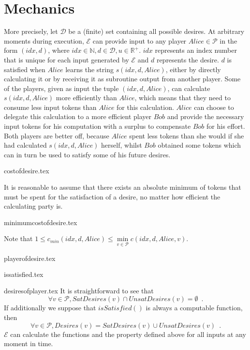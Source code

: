 \section{Mechanics}
  More precisely, let $\mathcal{D}$ be a (finite) set containing all possible desires. At
  arbitrary moments during execution, $\mathcal{E}$ can provide input to any player $Alice
  \in \mathcal{P}$ in the form $\left(idx, d\right)$, where $idx \in \mathbb{N}, d \in
  \mathcal{D}, u \in \mathbb{R}^{+}$. $idx$ represents an index number that is unique for
  each input generated by $\mathcal{E}$ and $d$ represents the desire. $d$ is satisfied
  when $Alice$ learns the string $s\left(idx, d, Alice\right)$, either by directly
  calculating it or by receiving it as subroutine output from another player. Some of the
  players, given as input the tuple $\left(idx, d, Alice\right)$, can calculate
  $s\left(idx, d, Alice\right)$ more efficiently than $Alice$, which means that they need
  to consume less input tokens than $Alice$ for this calculation. $Alice$ can choose to
  delegate this calculation to a more efficient player $Bob$ and provide the necessary
  input tokens for his computation with a surplus to compensate $Bob$ for his effort. Both
  players are better off, because $Alice$ spent less tokens than she would if she had
  calculated $s\left(idx, d, Alice\right)$ herself, whilst $Bob$ obtained some tokens
  which can in turn be used to satisfy some of his future desires.

  {costofdesire.tex}

  It is reasonable to assume that there exists an absolute minimum of tokens that must be
  spent for the satisfaction of a desire, no matter how efficient the calculating party
  is.

  {minimumcostofdesire.tex}

  \noindent Note that $1 \leq c_{min}\left(idx, d, Alice\right) \leq \min\limits_{v \in
  \mathcal{P}}{c\left(idx, d, Alice, v\right)}$.

  {playerofdesire.tex}

  {issatisfied.tex}

  {desiresofplayer.tex}
  It is straightforward to see that
  \begin{equation*}
    \forall v \in \mathcal{P}, SatDesires\left(v\right) \cap UnsatDesires\left(v\right) =
    \emptyset \enspace.
  \end{equation*}
  If additionally we suppose that $isSatisfied\left(\right)$ is always a computable
  function, then
  \begin{equation*}
    \forall v \in \mathcal{P}, Desires\left(v\right) = SatDesires\left(v\right) \cup
    UnsatDesires\left(v\right) \enspace.
  \end{equation*}
  $\mathcal{E}$ can calculate the functions and the property defined above for all inputs
  at any moment in time.

